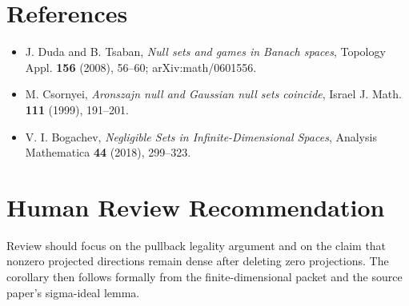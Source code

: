 \documentclass[11pt]{article}
\begin{document}
\section*{References}

\begin{itemize}
\item J. Duda and B. Tsaban, \emph{Null sets and games in Banach spaces},
Topology Appl. \textbf{156} (2008), 56--60; arXiv:math/0601556.
\item M. Csornyei, \emph{Aronszajn null and Gaussian null sets coincide},
Israel J. Math. \textbf{111} (1999), 191--201.
\item V. I. Bogachev, \emph{Negligible Sets in Infinite-Dimensional Spaces},
Analysis Mathematica \textbf{44} (2018), 299--323.
\end{itemize}

\section*{Human Review Recommendation}

Review should focus on the pullback legality argument and on the claim that
nonzero projected directions remain dense after deleting zero projections.
The corollary then follows formally from the finite-dimensional packet and
the source paper's sigma-ideal lemma.
\end{document}
